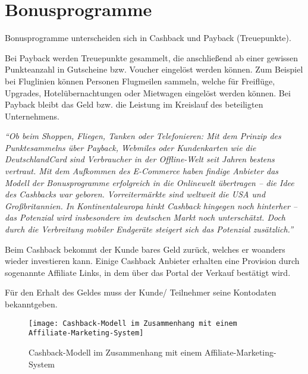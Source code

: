 \section{Bonusprogramme}
Bonusprogramme unterscheiden sich in Cashback und Payback (Treuepunkte). \newline

\noindent Bei Payback werden Treuepunkte gesammelt, die anschließend ab einer gewissen Punkteanzahl in Gutscheine bzw. Voucher eingelöst werden können. Zum Beispiel bei Fluglinien können Personen Flugmeilen sammeln, welche für Freiflüge, Upgrades, Hotelübernachtungen oder Mietwagen eingelöst werden können. Bei Payback bleibt das Geld bzw. die Leistung im Kreislauf des beteiligten Unternehmens. \cite{paycashback_all} \newline

\noindent \textit{``Ob beim Shoppen, Fliegen, Tanken oder Telefonieren: Mit dem Prinzip des Punktesammelns über Payback, Webmiles oder Kundenkarten wie die DeutschlandCard sind Verbraucher in der Offline-Welt seit Jahren bestens vertraut. Mit dem Aufkommen des E-Commerce haben findige Anbieter das Modell der Bonusprogramme erfolgreich in die Onlinewelt übertragen – die Idee des Cashbacks war geboren. Vorreitermärkte sind weltweit die USA und Großbritannien. In Kontinentaleuropa hinkt Cashback hingegen noch hinterher – das Potenzial wird insbesondere im deutschen Markt noch unterschätzt. Doch durch die Verbreitung mobiler Endgeräte steigert sich das Potenzial zusätzlich.'' \cite{Bonus_affiliate}} \newline

\noindent Beim Cashback bekommt der Kunde bares Geld zurück, welches er woanders wieder investieren kann. Einige Cashback Anbieter erhalten eine Provision durch sogenannte Affiliate Links, in dem über das Portal der Verkauf bestätigt wird. \cite{cashback-vergleich} \newline

\noindent Für den Erhalt des Geldes muss der Kunde/ Teilnehmer seine Kontodaten bekanntgeben. \cite{paycashback_all} \newline

\begin{figure}[!ht]
	\centering
	\texttt{[image: Cashback-Modell im Zusammenhang mit einem Affiliate-Marketing-System]}
	\caption{Cashback-Modell im Zusammenhang mit einem Affiliate-Marketing-System \cite{Bonus_affiliate} }
	\label{fig:Bonus_affiliate}
\end{figure}
\FloatBarrier

